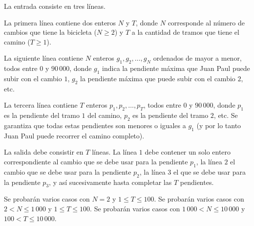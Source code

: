 \documentclass{oci}
\begin{document}
\begin{inputDescription}
La entrada consiste en tres líneas.

La primera línea contiene dos enteros $N$ y $T$, donde $N$ corresponde
al número de cambios que tiene la bicicleta ($N\geq 2$) y $T$ a la cantidad
de tramos que tiene el camino ($T\geq 1$).

La siguiente línea contiene $N$ enteros $g_1,g_2,\ldots, g_N$ ordenados de mayor
a menor, todos entre $0$ y $90\,000$, donde $g_1$ indica la pendiente máxima que
Juan Paul puede subir con el cambio $1$, $g_2$ la pendiente máxima que puede
subir con el cambio $2$, etc.

La tercera línea contiene $T$ enteros $p_1,p_2,\ldots,p_T$, todos entre $0$ y $90\,000$, 
donde $p_1$ es la pendiente del tramo $1$ del camino, $p_2$ es la pendiente
del tramo $2$, etc.
Se garantiza que todas estas pendientes son menores o iguales a $g_1$ (y por lo tanto Juan Paul
puede recorrer el camino completo).
\end{inputDescription}

\begin{outputDescription}
La salida debe consistir en $T$ líneas.
La línea $1$ debe contener un solo entero correspondiente al cambio que se debe usar para la pendiente $p_1$,
la línea $2$ el cambio que se debe usar para la pendiente $p_2$, la línea $3$ el que se debe usar 
para la pendiente $p_3$, y así sucesivamente hasta completar las $T$ pendientes.
\end{outputDescription}

\begin{scoreDescription}
   Se probarán varios casos con $N=2$ y $1\leq T\leq 100$.
   Se probarán varios casos con $2 < N \leq 1\,000$ y $1\leq T\leq 100$.
   Se probarán varios casos con $1\,000< N \leq 10\,000$ y $100 <
  T\leq 10\,000$.
\end{scoreDescription}

\begin{sampleDescription}
\end{sampleDescription}
\end{document}

